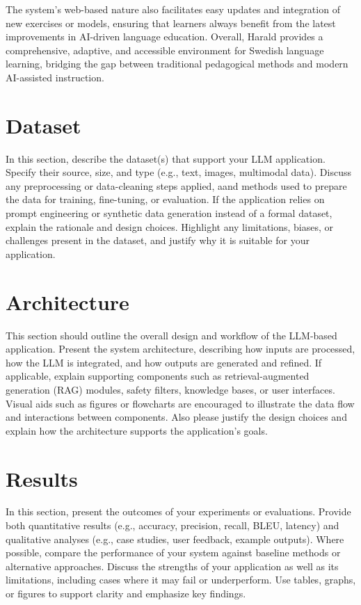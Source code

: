 \documentclass[a4paper,10pt]{article}
\begin{document}
The system’s web-based nature also facilitates easy updates and integration of new exercises or models, ensuring that learners always benefit from the latest improvements in AI-driven language education. Overall, Harald provides a comprehensive, adaptive, and accessible environment for Swedish language learning, bridging the gap between traditional pedagogical methods and modern AI-assisted instruction.


\section{Dataset}
In this section, describe the dataset(s) that support your LLM application. Specify their source, size, and type (e.g., text, images, multimodal data). Discuss any preprocessing or data-cleaning steps applied, aand methods used to prepare the data for training, fine-tuning, or evaluation. If the application relies on prompt engineering or synthetic data generation instead of a formal dataset, explain the rationale and design choices. Highlight any limitations, biases, or challenges present in the dataset, and justify why it is suitable for your application.

\section{Architecture}
This section should outline the overall design and workflow of the LLM-based application. Present the system architecture, describing how inputs are processed, how the LLM is integrated, and how outputs are generated and refined. If applicable, explain supporting components such as retrieval-augmented generation (RAG) modules, safety filters, knowledge bases, or user interfaces. Visual aids such as figures or flowcharts are encouraged to illustrate the data flow and interactions between components. Also please justify the design choices and explain how the architecture supports the application's goals.

\section{Results}
In this section, present the outcomes of your experiments or evaluations. Provide both quantitative results (e.g., accuracy, precision, recall, BLEU, latency) and qualitative analyses (e.g., case studies, user feedback, example outputs). Where possible, compare the performance of your system against baseline methods or alternative approaches. Discuss the strengths of your application as well as its limitations, including cases where it may fail or underperform. Use tables, graphs, or figures to support clarity and emphasize key findings.
\end{document}
